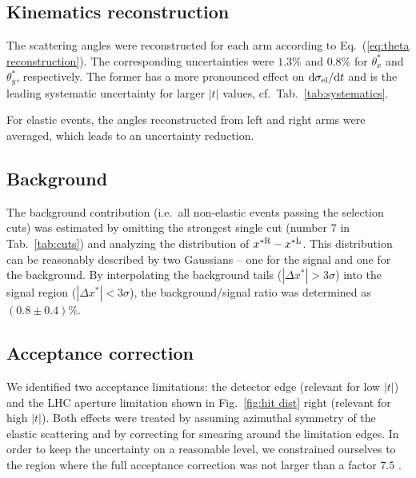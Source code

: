 \documentclass[doublecol]{../macros/epl2}
\def\d{{\rm d}}
\begin{document}
\subsection{Kinematics reconstruction}

The scattering angles were reconstructed for each arm according to Eq.~(\ref{eq:theta reconstruction}). The corresponding uncertainties were $1.3\%$ and $0.8\%$ for $\theta^*_x$ and $\theta^*_y$, respectively. The former has a more pronounced effect on $\d\sigma_{\rm el}/\d t$
and is the leading systematic uncertainty for larger $|t|$ values, cf.~Tab.~\ref{tab:systematics}.

For elastic events, the angles reconstructed from left and right arms were averaged, which leads to an uncertainty reduction.

\subsection{Background}

The background contribution (i.e.~all non-elastic events passing the selection cuts) was estimated by omitting the strongest single cut (number 7 in Tab.~\ref{tab:cuts}) and analyzing the distribution of $x^{*\rm R} - x^{*\rm L}$. This distribution can be reasonably described by two Gaussians -- one for the signal and one for the background. By interpolating the background tails ($|\Delta x^*| > 3\sigma$) into the signal region ($|\Delta x^*| < 3\sigma$), the background/signal ratio was determined as $(0.8 \pm 0.4)\%$.


\subsection{Acceptance correction}

We identified two acceptance limitations: the detector edge (relevant for low $|t|$) and the LHC aperture limitation shown in Fig.~\ref{fig:hit dist} right (relevant for high $|t|$). Both effects were treated by assuming azimuthal symmetry of the elastic scattering and by correcting for smearing around the limitation edges. In order to keep the uncertainty on a reasonable level, we constrained ourselves to the region where the full acceptance correction was not larger than a factor $7.5$%
.
\end{document}
